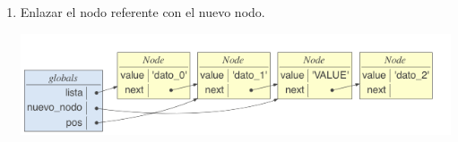 \begin{enumerate}
\item Enlazar el nodo referente con el nuevo nodo.

\hfil\begin{minipage}{.3\textwidth}
\end{minipage}
\begin{minipage}{.6\textwidth}
\includegraphics[width=\textwidth]{input/05-List-fig/ejemListaSingleLinkedInsert4}
\end{minipage}

\end{enumerate}


\

